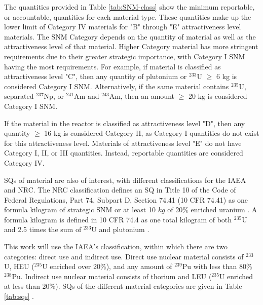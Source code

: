 The quantities provided in Table \ref{tab:SNM-class} show the minimum reportable, or accountable, quantities for each material type.
These quantities make up the lower limit of Category IV materials for "B" through "E" attractiveness level materials.
The \gls{SNM} Category depends on the quantity of material as well as the attractiveness level of that material.
Higher Category material has more stringent requirements due to their greater strategic importance, with Category I \gls{SNM} having the most requirements.
For example, if material is classified as attractiveness level "C", then any quantity of plutonium or $^{233}$U $\ge$ 6 kg is considered Category I \gls{SNM}.
Alternatively, if the same material contains $^{235}$U, separated $^{237}$Np, or $^{241}$Am and $^{243}$Am, then an amount $\ge$ 20 kg is considered Category I \gls{SNM}.

If the material in the reactor is classified as attractiveness level "D", then any quantity $\ge$ 16 kg is considered Category II, as Category I quantities do not exist for this attractiveness level.
Materials of attractiveness level "E" do not have Category I, II, or III quantities.
Instead, reportable quantities are considered Category IV.


\Glspl{SQ} of material are also of interest, with different classifications for the \gls{IAEA} and \gls{NRC}.
The \gls{NRC} classification defines an \gls{SQ} in Title 10 of the Code of Federal Regulations, Part 74, Subpart D, Section 74.41 (10 CFR 74.41) as one formula kilogram of strategic \gls{SNM} or at least 10 $kg$ of 20\% enriched uranium \cite{CFR2022}.
A formula kilogram is defined in 10 CFR 74.4 as one total kilogram of both $^{235}$U and 2.5 times the sum of $^{233}$U and plutonium \cite{CFR2022}.

This work will use the \gls{IAEA}'s classification, within which there are two categories: direct use and indirect use.
Direct use nuclear material consists of $^{233}$U, \gls{HEU} ($^{235}$U enriched over 20\%), and any amount of $^{239}$Pu with less than 80\% $^{238}$Pu.
Indirect use nuclear material consists of thorium and \gls{LEU} ($^{235}$U enriched at less than 20\%). 
SQs of the different material categories are given in Table \ref{tab:sqs} \cite{protection2011evaluation, international2022iaea, bathke2012attractive}.

